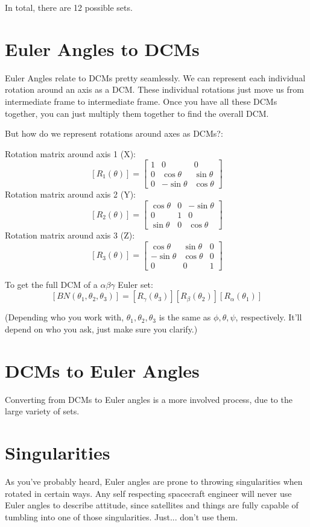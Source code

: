 \documentclass[a4paper,14pt]{extreport}
\begin{document}
In total, there are 12 possible sets.
\section{Euler Angles to DCMs}
Euler Angles relate to DCMs pretty seamlessly. We can represent each individual rotation around an axis as a DCM. These individual rotations just move us from intermediate frame to intermediate frame. Once you have all these DCMs together, you can just multiply them together to find the overall DCM. 

But how do we represent rotations around axes as DCMs?:
\begin{center}
Rotation matrix around axis 1 (X):
\[[R_1(\theta)] = \begin{bmatrix}
			1&0&0\\
			0&\cos{\theta}&\sin{\theta}\\
			0&-\sin{\theta}&\cos{\theta}
	\end{bmatrix}\]	
Rotation matrix around axis 2 (Y):
\[[R_2(\theta)] = \begin{bmatrix}
		\cos{\theta}&0&-\sin{\theta}\\
		0&1&0\\
		\sin{\theta}&0&\cos{\theta}
	\end{bmatrix}\]
Rotation matrix around axis 3 (Z):
\[[R_3(\theta)] = \begin{bmatrix}
		\cos{\theta}&\sin{\theta}&0\\
		-\sin{\theta}&\cos{\theta}&0\\
		0&0&1
	\end{bmatrix}\]

To get the full DCM of a $\alpha\beta\gamma$ Euler set:
\[[BN(\theta_1,\theta_2,\theta_3)] = [R_\gamma(\theta_3)][R_\beta(\theta_2)][R_\alpha(\theta_1)]\]
\end{center}
(Depending who you work with, $\theta_1,\theta_2,\theta_3$ is the same as $\phi,\theta,\psi$, respectively. It'll depend on who you ask, just make sure you clarify.)
\section{DCMs to Euler Angles}
Converting from DCMs to Euler angles is a more involved process, due to the large variety of sets.
\section{Singularities}
As you've probably heard, Euler angles are prone to throwing singularities when rotated in certain ways. Any self respecting spacecraft engineer will never use Euler angles to describe attitude, since satellites and things are fully capable of tumbling into one of those singularities. Just... don't use them.
\end{document}
